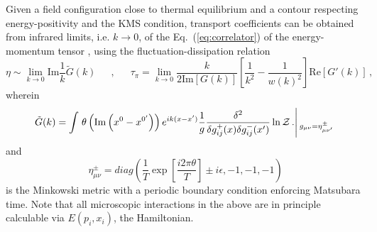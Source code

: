\documentclass[12pt,onecolumn,showpacs,amssymb,aps,nofootinbib,floatfix]{revtex4-2}
\renewcommand{\eqref}[1]{Eq.~(\ref{#1})}
\newcommand{\eqcomma}{\phantom{AA},\phantom{AA}}
\newcommand{\lnz}{\ln \mathcal{Z}}
\begin{document}
        \color{black}
        Given a field configuration close to thermal equilibrium and a contour respecting energy-positivity and the KMS condition, 
	transport coefficients can be obtained from infrared limits, i.e. $k\to 0$, of the \eqref{eq:correlator} of the energy-momentum tensor \cite{kadanoff,tong,jeon,jeonb,sonreview}, \color{black} using the fluctuation-dissipation relation
	\begin{equation}
		\label{eq:transportkubo}
		\eta \sim \lim_{k \rightarrow 0} \mathrm{Im} \frac{1}{k} \tilde{G}(k) \eqcomma \tau_\pi= \lim_{k\rightarrow 0}\frac{k}{2\mathrm{Im}[G(k)]} \left[ \frac{1}{k^2} - \frac{1}{w(k)^2} \right]\mathrm{Re}[G'(k)]\,,
	\end{equation}
	wherein \color{black}
	\begin{equation}
		\label{eq:correlator}
		\tilde{G}(k)=\int \left. \theta\left(\mathrm{Im}\left(x^0-x^{0'}\right)\right)  e^{ik(x-x')}\frac{1}{g} \frac{\delta^2}{\delta g_{ij}^+(x) \delta g_{ij}^-(x') } \lnz\,. \color{black} \right|_{g_{\mu \nu}=\eta^\pm_{\mu \nu'}} 
	\end{equation}
        and \[\  \eta^\pm_{\mu \nu}= diag\left( \frac{1}{T}\exp\left[ \frac{i2\pi \theta}{T}\right] \pm i\epsilon ,-1,-1,-1 \right) \] is the Minkowski metric with a periodic boundary condition enforcing Matsubara time.
        \color{black}
	Note that all microscopic interactions in the above are in principle calculable via $E(p_i,x_i)$, the Hamiltonian.
	
\end{document}
